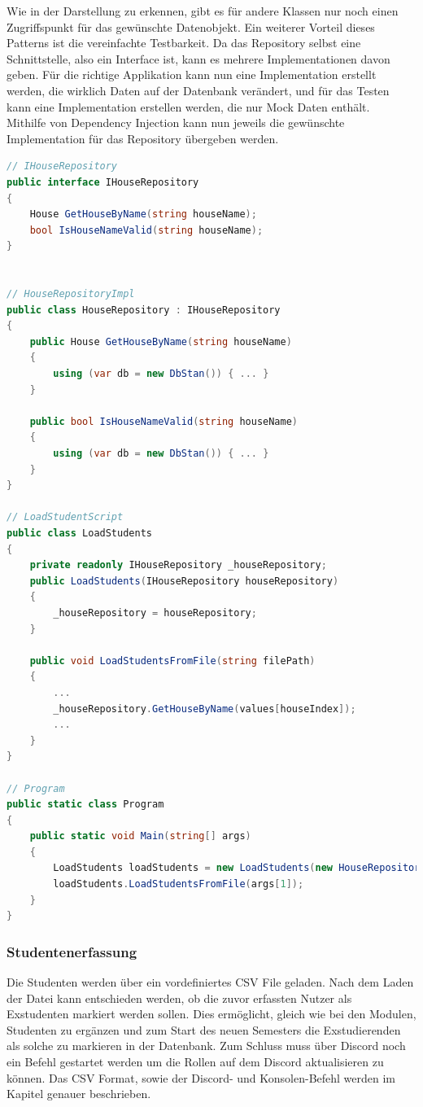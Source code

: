 \documentclass[a4paper, table]{article}
\begin{document}
Wie in der Darstellung zu erkennen, gibt es für andere Klassen nur noch einen Zugriffspunkt für das gewünschte Datenobjekt.
\newline
Ein weiterer Vorteil dieses Patterns ist die vereinfachte Testbarkeit.
Da das Repository selbst eine Schnittstelle, also ein Interface ist, kann es mehrere Implementationen davon geben.
Für die richtige Applikation kann nun eine Implementation erstellt werden, die wirklich Daten auf der Datenbank verändert,
und für das Testen kann eine Implementation erstellen werden, die nur Mock Daten enthält.\\
Mithilfe von Dependency Injection kann nun jeweils die gewünschte Implementation für das Repository übergeben werden.

\begin{lstlisting}[language=csharp]
// IHouseRepository
public interface IHouseRepository
{
    House GetHouseByName(string houseName);
    bool IsHouseNameValid(string houseName);
}


// HouseRepositoryImpl
public class HouseRepository : IHouseRepository
{
    public House GetHouseByName(string houseName)
    {
        using (var db = new DbStan()) { ... }
    }

    public bool IsHouseNameValid(string houseName)
    {
        using (var db = new DbStan()) { ... }
    }
}

// LoadStudentScript
public class LoadStudents
{
    private readonly IHouseRepository _houseRepository;
    public LoadStudents(IHouseRepository houseRepository)
    {
        _houseRepository = houseRepository;
    }

    public void LoadStudentsFromFile(string filePath)
    {
        ...
        _houseRepository.GetHouseByName(values[houseIndex]);
        ...
    }
}

// Program
public static class Program
{
    public static void Main(string[] args)
    {
        LoadStudents loadStudents = new LoadStudents(new HouseRepository());
        loadStudents.LoadStudentsFromFile(args[1]);
    }
}
\end{lstlisting}

\subsubsection{Studentenerfassung}

Die Studenten werden über ein vordefiniertes \gls{CSV} File geladen.
Nach dem Laden der Datei kann entschieden werden, ob die zuvor erfassten Nutzer als Exstudenten markiert werden sollen.
Dies ermöglicht, gleich wie bei den Modulen, Studenten zu ergänzen und zum Start des neuen Semesters die Exstudierenden als solche zu markieren in der Datenbank.
Zum Schluss muss über Discord noch ein Befehl gestartet werden um die Rollen auf dem Discord aktualisieren zu können.
Das \gls{CSV} Format, sowie der Discord- und Konsolen-Befehl werden im Kapitel  genauer beschrieben.
\end{document}
